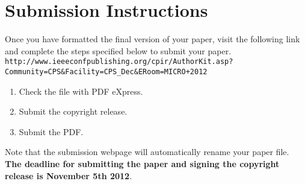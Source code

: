 \documentclass[final]{jpaper_micro_2012}
\begin{document}
\section{Submission Instructions}
Once you have formatted the final version of your paper, visit the
following link and complete the steps specified below to submit
your paper.\\

\noindent
\texttt{http://www.ieeeconfpublishing.org/cpir/AuthorKit.asp?
  Community=CPS\&Facility=CPS\_Dec\&ERoom=MICRO+2012}\\

\begin{enumerate}
\item Check the file with PDF eXpress.
\item Submit the copyright release.
\item Submit the PDF.\\
\end{enumerate}

Note that the submission webpage will automatically rename your
paper file. \textbf{The deadline for submitting the paper and signing the
copyright release is November 5th 2012}.



\end{document}
